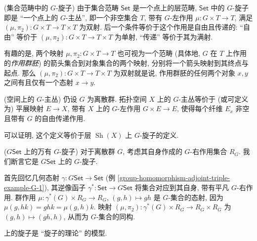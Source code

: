 %	

\begin{example}
	{(集合范畴中的 $G$-旋子)}
	由于集合范畴 $\mathsf {Set}$ 是一个点上的层范畴,
	$\mathsf {Set}$ 中的 $G$-旋子即是 ``一个点上的 $G$-主丛'',
	即一个非空集合 $T$, 带有 $G$-左作用 $\mu\colon G\times T \to T$, 满足 $(\mu,\pi_2)\colon G\times T \to T\times T$ 为双射.
	后一个条件等价于这个作用是自由且传递的:
	``自由'' 等价于 $(\mu,\pi_2)\colon G\times T \to T\times T$ 为单射, ``传递'' 等价于其为满射.
	
	有趣的是, 两个映射 $\mu,\pi_2\colon G\times T \to T$ 也可视为一个范畴 (具体地, $G$ 在 $T$ 上作用的\emph{作用群胚}) 的箭头集合到对象集合的两个映射, 分别将一个箭头映射到其终点与起点. 那么 $(\mu,\pi_2)\colon G\times T \to T\times T$ 为双射就是说, 作用群胚的任何两个对象 $x,y$ 之间有且仅有一个态射 $x\to y$.
\end{example}

\begin{example}
	{(空间上的 $G$-主丛)}
	仍设 $G$ 为离散群. 拓扑空间 $X$ 上的 $G$-主丛等价于 (或可定义为) 平展映射 $E \to X$, 带有 $X$ 上的 $G$-左作用 $G\times E \to E$, 使得每个纤维 $E_x$ 非空且带有 $G$ 的自由传递作用.
	
	可以证明, 这个定义等价于层\topos{} $\operatorname{Sh}(X)$ 上 $G$-旋子的定义.
\end{example}

\begin{example}
	{($G\mathsf {Set}$ 上的万有 $G$-旋子)}
	对于离散群 $G$, 考虑其自身作成的 $G$-右作用集合 $R_G$. 我们断言它是 $G\mathsf {Set}$ 上的 $G$-旋子.
	
	首先回忆几何态射 $\gamma\colon G\mathsf {Set} \to \mathsf {Set}$ (例 \ref{group-homomorphism-adjoint-triple-example-G-1}),
	其逆像函子 $\gamma^*\colon \mathsf {Set} \to G\mathsf {Set}$
	将集合对应到其自身, 带有平凡 $G$-右作用.
	群作用 $\mu\colon \gamma^*(G)\times R_G \to R_G$, $(g,h)\mapsto gh$ 是 $G$-集合的态射, 因为 $\mu(g,hk)=ghk=\mu(g,h)k$.
	映射 $(\mu,\pi_2)\colon \gamma^*(G)\times R_G\to R_G\times R_G$ 为 $(g,h)\mapsto (gh,h)$, 从而为 $G$-集合的同构.
\end{example}

\topos{}上的旋子是 ``旋子的理论'' 的模型.

